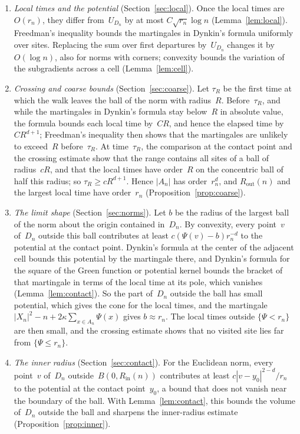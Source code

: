 \documentclass[11pt]{amsart}
\theoremstyle{plain}
\theoremstyle{definition}
\newcommand{\drift}{\kappa}
\newcommand{\gauge}{\Psi}
\newcommand{\Rin}{R_{\mathrm{in}}}
\newcommand{\Rout}{R_{\mathrm{out}}}
\numberwithin{equation}{section}
\begin{document}
\begin{enumerate}[label=\arabic*.,leftmargin=*]
\item \emph{Local times and the potential} (Section~\ref{sec:local}). Once the local times are $O(r_n)$, they differ from~$U_{D_n}$ by at most $C\sqrt{r_n}\log n$ (Lemma~\ref{lem:local}). Freedman's inequality bounds the martingales in Dynkin's formula uniformly over sites. Replacing the sum over first departures by~$U_{D_n}$ changes it by $O(\log n)$, also for norms with corners; convexity bounds the variation of the subgradients across a cell (Lemma~\ref{lem:cell}).
\item \emph{Crossing and coarse bounds} (Section~\ref{sec:coarse}). Let $\tau_R$ be the first time at which the walk leaves the ball of the norm with radius~$R$. Before~$\tau_R$, and while the martingales in Dynkin's formula stay below~$R$ in absolute value, the formula bounds each local time by~$CR$, and hence the elapsed time by~$CR^{d+1}$; Freedman's inequality then shows that the martingales are unlikely to exceed~$R$ before~$\tau_R$. At time~$\tau_R$, the comparison at the contact point and the crossing estimate show that the range contains all sites of a ball of radius~$cR$, and that the local times have order~$R$ on the concentric ball of half this radius; so $\tau_R\geq cR^{d+1}$. Hence $|A_n|$ has order~$r_n^d$, and $\Rout(n)$ and the largest local time have order~$r_n$ (Proposition~\ref{prop:coarse}).
\item \emph{The limit shape} (Section~\ref{sec:norms}). Let $b$ be the radius of the largest ball of the norm about the origin contained in~$D_n$. By convexity, every point~$v$ of~$D_n$ outside this ball contributes at least $c(\gauge(v)-b)r_n^{-d}$ to the potential at the contact point. Dynkin's formula at the center of the adjacent cell bounds this potential by the martingale there, and Dynkin's formula for the square of the Green function or potential kernel bounds the bracket of that martingale in terms of the local time at its pole, which vanishes (Lemma~\ref{lem:contact}). So the part of~$D_n$ outside the ball has small potential, which gives the cone for the local times, and the martingale $|X_n|^2-n+2\drift\sum_{x\in A_n}\gauge(x)$ gives $b\approx r_n$. The local times outside $\{\gauge<r_n\}$ are then small, and the crossing estimate shows that no visited site lies far from $\{\gauge\leq r_n\}$.
\item \emph{The inner radius} (Section~\ref{sec:contact}). For the Euclidean norm, every point~$v$ of~$D_n$ outside~$B(0,\Rin(n))$ contributes at least $c|v-y_0|^{2-d}/r_n$ to the potential at the contact point~$y_0$, a bound that does not vanish near the boundary of the ball. With Lemma~\ref{lem:contact}, this bounds the volume of~$D_n$ outside the ball and sharpens the inner-radius estimate (Proposition~\ref{prop:inner}).

\end{enumerate}
\end{document}
